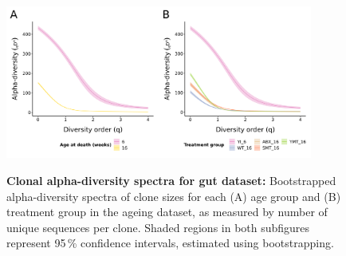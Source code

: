 \begin{figure}
\centering
\includegraphics[width = 0.9\textwidth]{_Figures/png/igseq-gut-clone-diversity-alpha}
\begin{subfigure}{0em}
\label{fig:igseq-gut-clone-diversity-alpha-age}
\end{subfigure}
\begin{subfigure}{0em}
\label{fig:igseq-gut-clone-diversity-alpha-groups}
\end{subfigure}
\caption[Clonal alpha-diversity spectra for \igseq gut dataset]{\textbf{Clonal alpha-diversity spectra for \igseq gut dataset:} Bootstrapped alpha-diversity spectra of clone sizes for each (A) age group and (B) treatment group in the \igseq ageing dataset, as measured by number of unique sequences per clone. Shaded regions in both subfigures represent 95\,\% confidence intervals, estimated using bootstrapping.}
\label{fig:igseq-gut-clone-diversity-alpha}
\end{figure}

